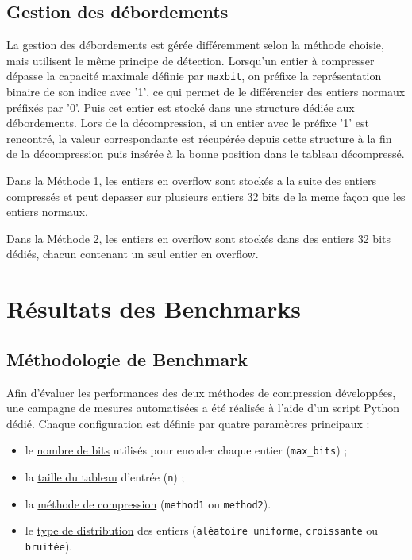 \documentclass{rapportClass} %
\begin{document}
\section{Gestion des débordements}
La gestion des débordements est gérée différemment selon la méthode choisie, mais utilisent le même principe de détection.
Lorsqu’un entier à compresser dépasse la capacité maximale définie par \texttt{maxbit}, on préfixe la représentation binaire de son indice avec '1',
ce qui permet de le différencier des entiers normaux préfixés par '0'.
Puis cet entier est stocké dans une structure dédiée aux débordements.
Lors de la décompression, si un entier avec le préfixe '1' est rencontré, la valeur correspondante est récupérée depuis cette structure à la fin de la décompression puis insérée à la bonne position dans le tableau décompressé.


Dans la Méthode 1, les entiers en overflow sont stockés a la suite des entiers compressés et peut depasser sur plusieurs entiers 32 bits de la meme façon que les entiers normaux.

Dans la Méthode 2, les entiers en overflow sont stockés dans des entiers 32 bits dédiés, chacun contenant un seul entier en overflow.

\chapter{Résultats des Benchmarks}

\section{Méthodologie de Benchmark}

Afin d’évaluer les performances des deux méthodes de compression développées, une campagne de
mesures automatisées a été réalisée à l’aide d’un script Python dédié.  
Chaque configuration est définie par quatre paramètres principaux :
\begin{itemize}
    \item le \underline{nombre de bits} utilisés pour encoder chaque entier (\texttt{max\_bits}) ;
    \item la \underline{taille du tableau} d’entrée (\texttt{n}) ;
    \item la \underline{méthode de compression} (\texttt{method1} ou \texttt{method2}).
    \item le \underline{type de distribution} des entiers (\texttt{aléatoire uniforme}, \texttt{croissante} ou \texttt{bruitée}).
\end{itemize}
\end{document}
